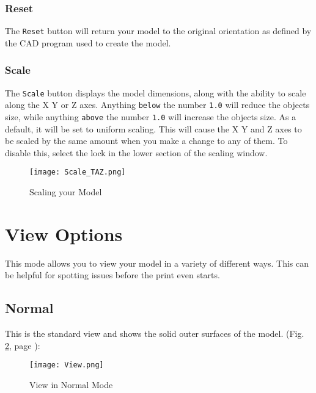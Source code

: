 \subsubsection{Reset}
The \texttt{Reset} button will return your model to the original orientation as defined by the CAD program used to create the model.

\subsubsection{Scale}
The \texttt{Scale} button displays the model dimensions, along with the ability to scale along the X Y or Z axes. Anything \texttt{below} the number \texttt{1.0} will reduce the objects size, while anything \texttt{above} the number \texttt{1.0} will increase the objects size. As a default, it will be set to uniform scaling. This will cause the X Y and Z axes to be scaled by the same amount when you make a change to any of them. To disable this, select the lock in the lower section of the scaling window. 
\begin{figure}[H]
\centering
\texttt{[image: Scale\_TAZ.png]}
\caption{Scaling your Model}
\label{fig:Scaling your Model}
\end{figure}

\section{View Options}
This mode allows you to view your model in a variety of different ways. This can be helpful for spotting issues before the print even starts. 

\subsection{Normal}
This is the standard view and shows the solid outer surfaces of the model. (Fig. \ref{fig:Normal View}, page \pageref{fig:Normal View}): 

\begin{figure}[H]
\centering
\texttt{[image: View.png]}
\caption{View in Normal Mode}
\label{fig:Normal View}
\end{figure}

